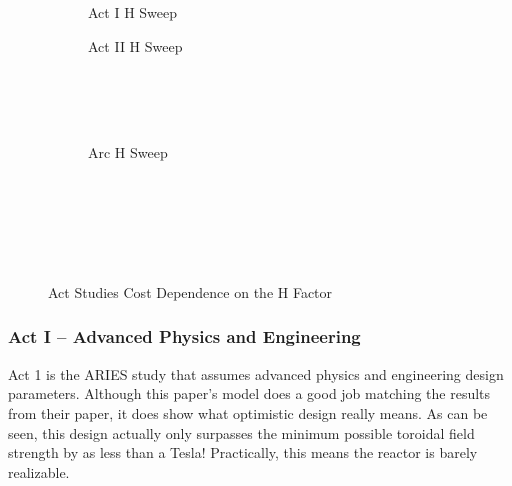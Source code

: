 \begin{figure*}[h!]
    \centering
    \hfill 
    \begin{subfigure}[t]{0.4\textwidth}
        \centering
    \begin{adjustbox}{width=\textwidth}
      \Large
      
    \end{adjustbox}
        \caption{Act I H Sweep}
    \end{subfigure}
    \hfill
    \begin{subfigure}[t]{0.4\textwidth}
        \centering
    \begin{adjustbox}{width=\textwidth}
      \Large
      
    \end{adjustbox}
        \caption{Act II H Sweep}
    \end{subfigure}
    \hfill \hfill ~\\ ~\\ ~\\
    \begin{subfigure}[t]{0.4\textwidth}
        \centering
		\begin{adjustbox}{width=\textwidth}
			\Large
			
		\end{adjustbox}
        \caption{Arc H Sweep}
    \end{subfigure} ~\\ ~\\ ~\\
    \caption{Act Studies Cost Dependence on the H Factor} ~\\    
	\label{fig:act_h_cost}
\end{figure*}

\newpage 

\subsubsection{Act I -- Advanced Physics and Engineering}

Act 1 is the ARIES study that assumes advanced physics and engineering design parameters. Although this paper's model does a good job matching the results from their paper, it does show what optimistic design really means. As can be seen, this design actually only surpasses the minimum possible toroidal field strength by as less than a Tesla! Practically, this means the reactor is barely realizable.

